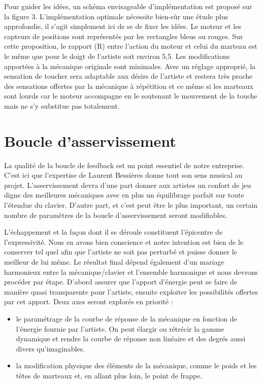 \documentclass[french,a4paper,12pt]{report}
\begin{document}
Pour guider les idées, un schéma envisageable d’implémentation est proposé sur la figure 3. L’implémentation optimale nécessite bien-sûr une étude plus approfondie, il s’agit simplement ici de se de fixer les idées. Le moteur et les capteurs de positions sont représentés par les rectangles bleus ou rouges. Sur cette proposition, le rapport (R) entre l’action du moteur et celui du marteau est le même que pour le doigt de l’artiste soit environ 5,5. Les modifications apportées à la mécanique originale sont minimales. Avec un réglage approprié, la sensation
de toucher sera adaptable aux désirs de l’artiste et restera très proche des sensations offertes par la mécanique à répétition et ce même si les marteaux sont lourds car le moteur accompagne en le soutenant le mouvement de la touche mais ne s’y substitue pas totalement.
\newpage

  \section{Boucle d'asservissement}

La qualité de la boucle de feedback est un point essentiel de notre entreprise. C’est ici que l’expertise de Laurent Bessières donne tout son sens musical au projet. L’asservissement devra d’une part donner aux artistes un confort de jeu digne des meilleures mécaniques avec en plus un équilibrage parfait sur toute l’étendue du clavier. D’autre part, et c’est peut être le plus important, un certain nombre de paramètres de la boucle d’asservissement seront modifiables.

L’échappement et la façon dont il se déroule constituent l’épicentre de l’expressivité. Nous en avons bien conscience et notre intention est bien de le conserver tel quel afin que l’artiste ne soit pas perturbé et puisse donner le meilleur de lui même. Le résultat final dépend également d’un mariage harmonieux entre la mécanique/clavier et l’ensemble harmonique et nous devrons procéder par étape. D’abord assurer que l’apport d’énergie peut se faire de manière quasi transparente pour l’artiste, ensuite exploiter les possibilités offertes par cet apport. Deux axes seront explorés en priorité :

\begin{itemize}
\item  le paramétrage de la courbe de réponse de la mécanique en fonction de l’énergie fournie par l’artiste. On peut élargir ou rétrécir la gamme dynamique et rendre la courbe de réponse non linéaire et des degrés aussi divers qu'imaginables.

\item  la modification physique des éléments de la mécanique, comme le poids et les têtes de marteaux et, en allant plus loin, le point de frappe.
\end{itemize}
\end{document}
